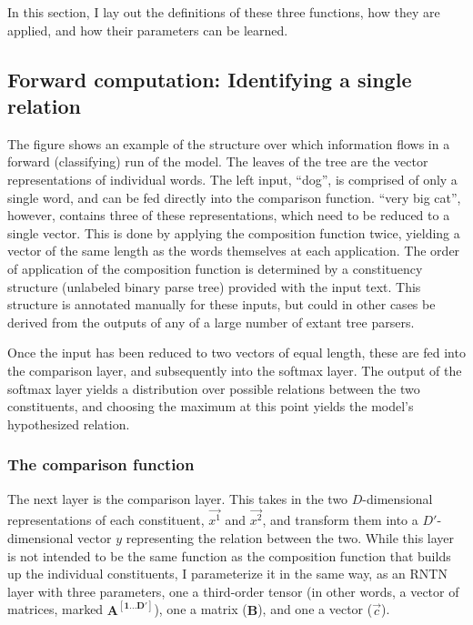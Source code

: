 \documentclass[12pt,leqno,tbtags,twoside]{article}
\theoremstyle{dotless}
\begin{document}
In this section, I lay out the definitions of these three functions, how they are applied, and how their parameters can be learned.

\subsection{Forward computation: Identifying a single relation}

The figure shows an example of the structure over which information flows in a forward (classifying) run of the model. The leaves of the tree are the vector representations of individual words. The left input, ``dog'', is comprised of only a single word, and can be fed directly into the comparison function. ``very big cat'', however, contains three of these representations, which need to be reduced to a single vector. This is done by applying the composition function twice, yielding a vector of the same length as the words themselves at each application. The order of application of the composition function is determined by a constituency structure (unlabeled binary parse tree) provided with the input text. This structure is annotated manually for these inputs, but could in other cases be derived from the outputs of any of a large number of extant tree parsers.

Once the input has been reduced to two vectors of equal length, these are fed into the comparison layer, and subsequently into the softmax layer. The output of the softmax layer yields a distribution over possible relations between the two constituents, and choosing the maximum at this point yields the model's hypothesized relation.

\subsubsection{The comparison function}

The next layer is the comparison layer. This takes in the two $D$-dimensional representations of each constituent, $\vec{x^1}$ and $\vec{x^2}$, and transform them into a $D'$-dimensional vector $y$ representing the relation between the two. While this layer is not intended to be the same function as the composition function that builds up the individual constituents, I parameterize it in the same way, as an RNTN layer with three parameters, one a third-order tensor (in other words, a vector of matrices, marked $\mathbf{A^{[1...D']}}$), one a matrix  ($\mathbf{B}$), and one a vector ($\vec{c}$).
\end{document}
